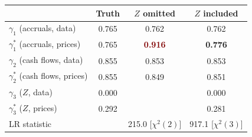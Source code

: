 \begin{tabular}{@{}lccc@{}}
\toprule
 & Truth & $Z$ omitted & $Z$ included \\
\midrule
$\gamma_1$ (accruals, data) & 0.765 & 0.762 & 0.762 \\
$\gamma_1^{*}$ (accruals, prices) & 0.765 & \textcolor{Maroon}{\bfseries 0.916} & \textcolor{DeepNavy}{\bfseries 0.776} \\
$\gamma_2$ (cash flows, data) & 0.855 & 0.853 & 0.853 \\
$\gamma_2^{*}$ (cash flows, prices) & 0.855 & 0.849 & 0.851 \\
$\gamma_3$ ($Z$, data) & 0.000 & & 0.000 \\
$\gamma_3^{*}$ ($Z$, prices) & 0.292 & & 0.281 \\
\midrule
LR statistic & & 215.0 {\small [$\chi^2(2)$]} & 917.1 {\small [$\chi^2(3)$]} \\
\bottomrule
\end{tabular}
